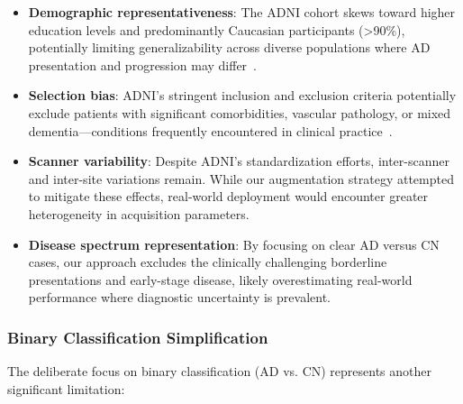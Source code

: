 \documentclass[12pt, a4paper]{article}
\begin{document}
\begin{itemize}
    \item \textbf{Demographic representativeness}: The ADNI cohort skews toward higher education levels and predominantly Caucasian participants (>90\%), potentially limiting generalizability across diverse populations where AD presentation and progression may differ~\cite{lamontagne2019oasis, jack2008alzheimer}.
    
    \item \textbf{Selection bias}: ADNI's stringent inclusion and exclusion criteria potentially exclude patients with significant comorbidities, vascular pathology, or mixed dementia—conditions frequently encountered in clinical practice~\cite{jack2008alzheimer}.
    
    \item \textbf{Scanner variability}: Despite ADNI's standardization efforts, inter-scanner and inter-site variations remain. While our augmentation strategy attempted to mitigate these effects, real-world deployment would encounter greater heterogeneity in acquisition parameters.
    
    \item \textbf{Disease spectrum representation}: By focusing on clear AD versus CN cases, our approach excludes the clinically challenging borderline presentations and early-stage disease, likely overestimating real-world performance where diagnostic uncertainty is prevalent.
\end{itemize}

\subsubsection{Binary Classification Simplification}

The deliberate focus on binary classification (AD vs. CN) represents another significant limitation:
\end{document}
